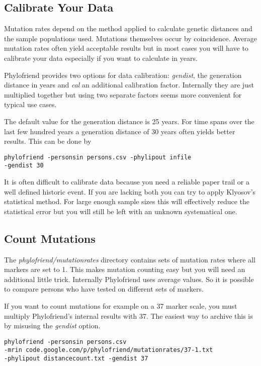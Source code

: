 \subsection{Calibrate Your Data}

Mutation rates depend on the method applied to calculate
genetic distances and the sample populations used. Mutations
themselves occur by coincidence. Average mutation rates
often yield acceptable results but in most cases you will
have to calibrate your data especially if you want to
calculate in years.

Phylofriend provides two options for data calibration:
\emph{gendist}, the generation distance in years and
\emph{cal} an additional calibration factor. Internally
they are just multiplied together but using two separate
factors seems more convenient for typical use cases.

The default value for the generation distance is 25 years.
For time spans over the last few hundred years a generation
distance of 30 years often yields better results. This can
be done by

\noindent\texttt{phylofriend -personsin persons.csv -phylipout infile\\
-gendist 30}

It is often difficult to calibrate data because you need a
reliable paper trail or a well defined historic event. If
you are lacking both you can try to apply Klyosov's statistical
method\cite{Kly09}. For large enough sample sizes this will
effectively reduce the statistical error but you will still
be left with an unknown systematical one.


\subsection{Count Mutations}

The \emph{phylofriend/mutationrates} directory contains
sets of mutation rates where all markers are set to 1.
This makes mutation counting easy but you will need an
additional little trick. Internally Phylofriend uses
average values. So it is possible to compare persons who
have tested on different sets of markers.

If you want to count mutations for example on a 37 marker
scale, you must multiply Phylofriend's internal results with
37. The easiest way to archive this is by misusing the
\emph{gendist} option. 

\noindent\texttt{phylofriend -personsin persons.csv\\
-mrin code.google.com/p/phylofriend/mutationrates/37-1.txt\\
-phylipout distancecount.txt -gendist 37}


